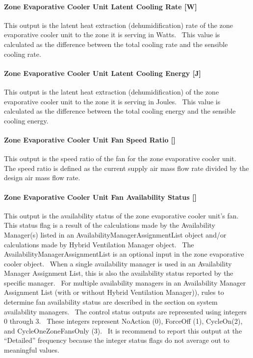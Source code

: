 \paragraph{Zone Evaporative Cooler Unit Latent Cooling Rate {[}W{]}}\label{zone-evaporative-cooler-unit-latent-cooling-rate-w}

This output is the latent heat extraction (dehumidification) rate of the zone evaporative cooler unit to the zone it is serving in Watts.~ This value is calculated as the difference between the total cooling rate and the sensible cooling rate.

\paragraph{Zone Evaporative Cooler Unit Latent Cooling Energy {[}J{]}}\label{zone-evaporative-cooler-unit-latent-cooling-energy-j}

This output is the latent heat extraction (dehumidification) of the zone evaporative cooler unit to the zone it is serving in Joules.~ This value is calculated as the difference between the total cooling energy and the sensible cooling energy.

\paragraph{Zone Evaporative Cooler Unit Fan Speed Ratio {[]}}\label{zone-evaporative-cooler-unit-fan-speed-ratio}

This output is the speed ratio of the fan for the zone evaporative cooler unit.~ The speed ratio is defined as the current supply air mass flow rate divided by the design air mass flow rate.

\paragraph{Zone Evaporative Cooler Unit Fan Availability Status {[]}}\label{zone-evaporative-cooler-unit-fan-availability-status}

This output is the availability status of the zone evaporative cooler unit's fan.~ This status flag is a result of the calculations made by the Availability Manager(s) listed in an AvailabilityManagerAssignmentList object and/or calculations made by Hybrid Ventilation Manager object.~ The AvailabilityManagerAssignmentList is an optional input in the zone evaporative cooler object.~ When a single availability manager is used in an Availability Manager Assignment List, this is also the availability status reported by the specific manager.~ For multiple availability managers in an Availability Manager Assignment List (with or without Hybrid Ventilation Manager)), rules to determine fan availability status are described in the section on system availability managers.~ The control status outputs are represented using integers 0 through 3.~ These integers represent NoAction (0), ForceOff (1), CycleOn(2), and CycleOneZoneFansOnly (3).~ It is recommend to report this output at the ``Detailed'' frequency because the integer status flags do not average out to meaningful values.

